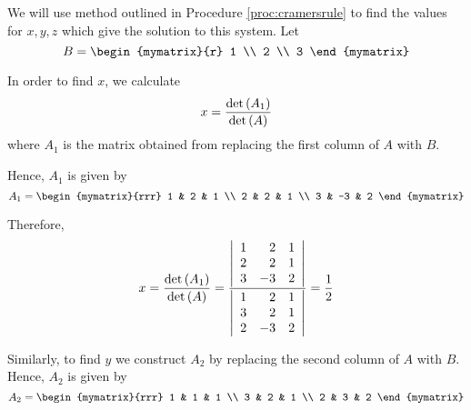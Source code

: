 \begin{solution} We will use method outlined in Procedure \ref{proc:cramersrule} to find the values for
$x,y,z$ which give the solution to this system. 
Let
\begin{equation*}
B = 
\begin{mymatrix}{r}
1 \\
2 \\
3
\end{mymatrix} 
\end{equation*}

In order to find $x$, we calculate
\begin{equation*}
x =
\vspace{0.05in}\frac{\det \tup{A_{1}}}{\det \tup{A}}
\end{equation*}
where $A_1$ is the matrix obtained from replacing the first column of $A$ with $B$.

Hence, $A_1$ is given by 
\begin{equation*}
A_1 = 
\begin{mymatrix}{rrr}
1 & 2 & 1 \\
2 & 2 & 1 \\
3 & -3 & 2
\end{mymatrix}
\end{equation*}

Therefore,
\begin{equation*}
x=
\vspace{0.05in}\frac{\det \tup{A_{1}}}{\det \tup{A}}
=
\vspace{0.05in}\frac{\left|
\begin{array}{rrr}
1 &  2 & 1 \\
2 &  2 & 1 \\
3 & -3 & 2
\end{array}
\right| }{\left|
\begin{array}{rrr}
1 & 2 & 1 \\
3 & 2 & 1 \\
2 & -3 & 2
\end{array}
\right| }=\vspace{0.05in}\frac{1}{2}
\end{equation*}

Similarly, to find $y$ we construct $A_2$ by replacing the second column of $A$ with $B$. Hence, $A_2$ is given by
\begin{equation*}
A_2
=
\begin{mymatrix}{rrr}
1 & 1 & 1 \\
3 & 2 & 1 \\
2 & 3 & 2
\end{mymatrix}
\end{equation*}


\end{solution}
